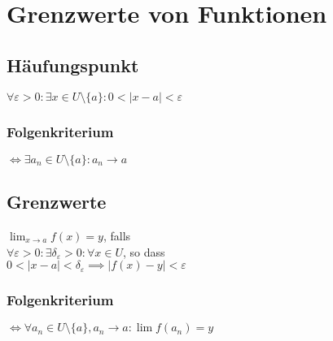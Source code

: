 \section*{Grenzwerte von Funktionen}

\subsection*{Häufungspunkt}
$\forall \varepsilon>0: \exists x\in U\setminus\{a\}: 0<|x-a|<\varepsilon$

\subsubsection*{Folgenkriterium}
$\iff \exists a_n \in U\setminus\{a\}: a_n \longrightarrow a$

\subsection*{Grenzwerte}
$\displaystyle \lim_{x\to a}f(x)=y$, falls \\
$\forall \varepsilon>0:\exists \delta_\varepsilon>0:\forall x\in U$, so dass\\
$0<|x-a|<\delta_\varepsilon \implies |f(x)-y|<\varepsilon$

\subsubsection*{Folgenkriterium}
$\Leftrightarrow \forall a_n\in U\setminus\{a\}, a_n \to a: \lim f(a_n)=y$
